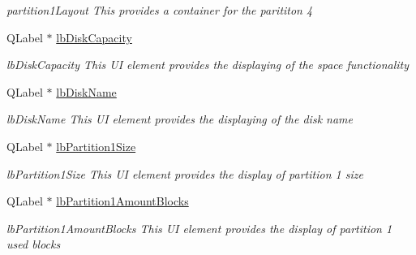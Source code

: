 \begin{DoxyCompactItemize}
\begin{DoxyCompactList}\small\item\em partition1\+Layout This provides a container for the parititon 4 \end{DoxyCompactList}\item 
\mbox{\label{class_disk_info_a2ca6c62f838ef44eb91bb5fd9d01ad34}} 
Q\+Label $\ast$ \mbox{\hyperlink{class_disk_info_a2ca6c62f838ef44eb91bb5fd9d01ad34}{lb\+Disk\+Capacity}}
\begin{DoxyCompactList}\small\item\em lb\+Disk\+Capacity This UI element provides the displaying of the space functionality \end{DoxyCompactList}\item 
\mbox{\label{class_disk_info_a7ac865b6558bc7322b9443e6b67d0313}} 
Q\+Label $\ast$ \mbox{\hyperlink{class_disk_info_a7ac865b6558bc7322b9443e6b67d0313}{lb\+Disk\+Name}}
\begin{DoxyCompactList}\small\item\em lb\+Disk\+Name This UI element provides the displaying of the disk name \end{DoxyCompactList}\item 
\mbox{\label{class_disk_info_ac39af4d2472ed024615517aef7c59eba}} 
Q\+Label $\ast$ \mbox{\hyperlink{class_disk_info_ac39af4d2472ed024615517aef7c59eba}{lb\+Partition1\+Size}}
\begin{DoxyCompactList}\small\item\em lb\+Partition1\+Size This UI element provides the display of partition 1 size \end{DoxyCompactList}\item 
\mbox{\label{class_disk_info_a4e6052d884ab0f8fc841c911b8671f9b}} 
Q\+Label $\ast$ \mbox{\hyperlink{class_disk_info_a4e6052d884ab0f8fc841c911b8671f9b}{lb\+Partition1\+Amount\+Blocks}}
\begin{DoxyCompactList}\small\item\em lb\+Partition1\+Amount\+Blocks This UI element provides the display of partition 1 used blocks \end{DoxyCompactList}\item 
\mbox{\label{class_disk_info_a4863cdef7ad1b794958ed5ce11f98a0c}} 

\end{DoxyCompactItemize}

